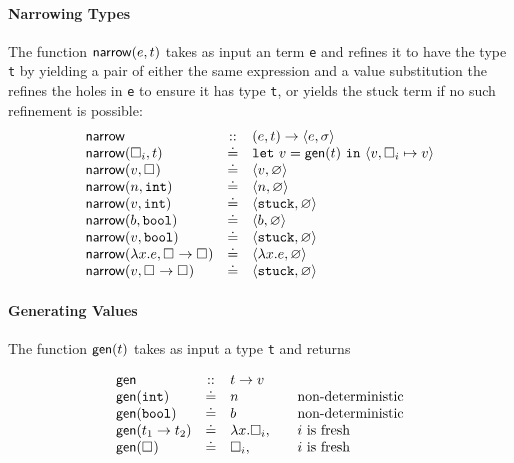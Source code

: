 \paragraph{Narrowing Types} The function $\mathsf{narrow}(e, t)$ takes as
input an term \texttt{e} and refines it to have the type \texttt{t}
by yielding a pair of either the same expression and a value substitution
the refines the holes in \texttt{e} to ensure it has type \texttt{t},
or yields the stuck term if no such refinement is possible:
%
$$
\begin{array}{lcl}
\mathsf{narrow}            & ::     & (e, t) \rightarrow \langle e, \sigma \rangle \\
\mathsf{narrow}(\square_{i}, t) & \doteq & \mathtt{let}\ v = \mathsf{gen}(t)\ \mathtt{in}\ \langle v, \square_{i} \mapsto v \rangle \\
\mathsf{narrow}(v, \square_{})  & \doteq & \langle v, \varnothing \rangle \\
\mathsf{narrow}(n, \mathtt{int})     & \doteq & \langle n, \varnothing \rangle \\
\mathsf{narrow}(v, \mathtt{int})     & \doteq & \langle \mathtt{stuck}, \varnothing \rangle \\
\mathsf{narrow}(b, \mathtt{bool})    & \doteq & \langle b, \varnothing \rangle \\
\mathsf{narrow}(v, \mathtt{bool})    & \doteq & \langle \mathtt{stuck}, \varnothing \rangle \\
\mathsf{narrow}(\lambda x. e, {\square_{}} \rightarrow \square_{}) & \doteq & \langle \lambda x. e, \varnothing \rangle \\
\mathsf{narrow}(v, {\square_{}} \rightarrow \square_{}) & \doteq & \langle \mathtt{stuck}, \varnothing \rangle \\
\end{array}
$$

\paragraph{Generating Values} The function $\mathsf{gen}(t)$ takes as input a type
\texttt{t} and returns 

$$
\begin{array}{lcll}
\mathsf{gen}       & ::      & t \rightarrow v \\
\mathsf{gen}(\mathtt{int})   & \doteq  & n & \quad \text{non-deterministic} \\
\mathsf{gen}(\mathtt{bool})  & \doteq  & b & \quad \text{non-deterministic} \\
\mathsf{gen}({t_1} \rightarrow t_2)   & \doteq & \lambda x. \square_{i}, & \quad \text{$i$ is fresh} \\
\mathsf{gen}(\square_{}) & \doteq & \square_{i}, & \quad \text{$i$ is fresh} \\
\end{array}
$$




